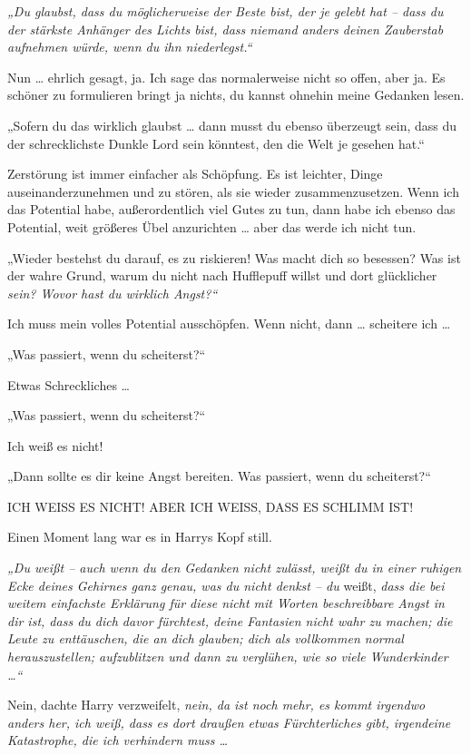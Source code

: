 {\emph{„Du glaubst, dass du möglicherweise der Beste bist, der je gelebt hat -- dass du der stärkste Anhänger des Lichts bist, dass niemand anders deinen Zauberstab aufnehmen würde, wenn du ihn niederlegst.“}

Nun … ehrlich gesagt, ja. Ich sage das normalerweise nicht so offen, aber ja. Es schöner zu formulieren bringt ja nichts, du kannst ohnehin meine Gedanken lesen.

„Sofern du das wirklich glaubst … dann musst du ebenso überzeugt sein, dass du der schrecklichste Dunkle Lord sein könntest, den die Welt je gesehen hat.“

Zerstörung ist immer einfacher als Schöpfung. Es ist leichter, Dinge auseinanderzunehmen und zu stören, als sie wieder zusammenzusetzen. Wenn ich das Potential habe, außerordentlich viel Gutes zu tun, dann habe ich ebenso das Potential, weit größeres Übel anzurichten … aber das werde ich nicht tun.

„Wieder bestehst du darauf, es zu riskieren! Was macht dich so besessen? Was ist der wahre Grund, warum du nicht nach Hufflepuff willst und dort glücklicher \emph{sein? Wovor hast du wirklich Angst?“}

Ich muss mein volles Potential ausschöpfen. Wenn nicht, dann … scheitere ich …

„Was passiert, wenn du scheiterst?“

Etwas Schreckliches …

„Was passiert, wenn du scheiterst?“

Ich weiß es nicht!

„Dann sollte es dir keine Angst bereiten. Was passiert, wenn du scheiterst?“

ICH WEISS ES NICHT! ABER ICH WEISS, DASS ES SCHLIMM IST!

Einen Moment lang war es in Harrys Kopf still.

\emph{„Du weißt -- auch wenn du den Gedanken nicht zulässt, weißt du in einer ruhigen Ecke deines Gehirnes ganz genau, was du nicht denkst -- du} weißt, \emph{dass die bei weitem einfachste Erklärung für diese nicht mit Worten beschreibbare Angst in dir ist, dass du dich davor fürchtest, deine Fantasien nicht wahr zu machen; die Leute zu enttäuschen, die an dich glauben; dich als vollkommen normal herauszustellen; aufzublitzen und dann zu verglühen, wie so viele Wunderkinder …“}

Nein, dachte Harry verzweifelt, \emph{nein, da ist noch mehr, es kommt irgendwo anders her, ich weiß, dass es dort draußen etwas Fürchterliches gibt, irgendeine Katastrophe, die ich verhindern muss …}

}
